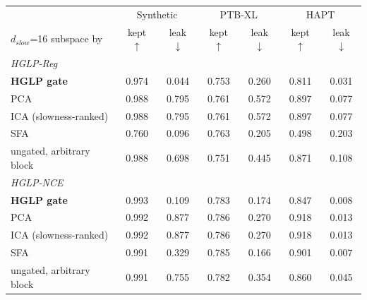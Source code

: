 \begin{tabular}{lcccccc}
\toprule
 & \multicolumn{2}{c}{Synthetic} & \multicolumn{2}{c}{PTB-XL} & \multicolumn{2}{c}{HAPT} \\
$d_{slow}$=16 subspace by & kept $\uparrow$ & leak $\downarrow$ & kept $\uparrow$ & leak $\downarrow$ & kept $\uparrow$ & leak $\downarrow$ \\
\midrule
\multicolumn{7}{l}{\emph{HGLP-Reg}} \\
\textbf{HGLP gate} & 0.974 & 0.044 & 0.753 & 0.260 & 0.811 & 0.031 \\
PCA & 0.988 & 0.795 & 0.761 & 0.572 & 0.897 & 0.077 \\
ICA (slowness-ranked) & 0.988 & 0.795 & 0.761 & 0.572 & 0.897 & 0.077 \\
SFA & 0.760 & 0.096 & 0.763 & 0.205 & 0.498 & 0.203 \\
ungated, arbitrary block & 0.988 & 0.698 & 0.751 & 0.445 & 0.871 & 0.108 \\
\midrule
\multicolumn{7}{l}{\emph{HGLP-NCE}} \\
\textbf{HGLP gate} & 0.993 & 0.109 & 0.783 & 0.174 & 0.847 & 0.008 \\
PCA & 0.992 & 0.877 & 0.786 & 0.270 & 0.918 & 0.013 \\
ICA (slowness-ranked) & 0.992 & 0.877 & 0.786 & 0.270 & 0.918 & 0.013 \\
SFA & 0.991 & 0.329 & 0.785 & 0.166 & 0.901 & 0.007 \\
ungated, arbitrary block & 0.991 & 0.755 & 0.782 & 0.354 & 0.860 & 0.045 \\
\bottomrule
\end{tabular}
